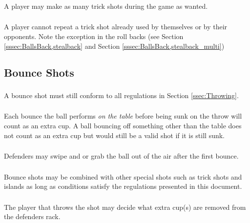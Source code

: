 		\subsubsection{}\label{sssec:TrickShot,number}
			A player may make as many trick shots during the game as wanted.
		\subsubsection{}\label{sssec:TrickShot,repeat}
			A player cannot repeat a trick shot already used by themselves or by their opponents.
            Note the exception in the roll backs (see Section \ref{sssec:BallsBack,stealback} and Section \ref{sssec:BallsBack,stealback_multi})
		
	\subsection{Bounce Shots}\label{ssec:BounceShots}
		\subsubsection{}\label{sssec:BounceShots,rules}
			A bounce shot must still conform to all regulations in Section \ref{ssec:Throwing}.
		\subsubsection{}\label{sssec:BounceShots,multibounce}
			Each bounce the ball performs \textit{on the table} before being sunk on the throw will count as an extra cup.
            A ball bouncing off something other than the table does not count as an extra cup but would still be a valid shot if it is still sunk.
		\subsubsection{}\label{sssec:BounceShots,swipegrab}
			Defenders may swipe and or grab the ball out of the air after the first bounce.
		\subsubsection{}\label{sssec:BounceShots,combo}
			Bounce shots may be combined with other special shots such as trick shots and islands as long as conditions satisfy the regulations presented in this document.
		\subsubsection{}\label{sssec:BounceShots,removedcups}
			The player that throws the shot may decide what extra cup(s) are removed from the defenders rack.
